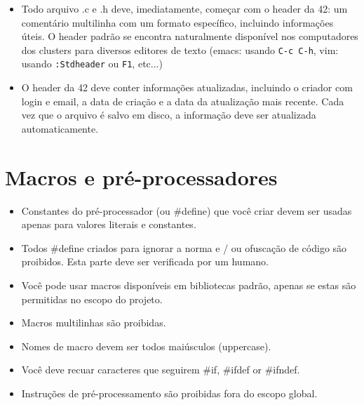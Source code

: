 \documentclass{42-pt}
\begin{document}
        \begin{itemize}

        \item Todo arquivo .c e .h deve, imediatamente, começar com o header da 42:
          um comentário multilinha com um formato específico, incluindo informações
          úteis. O header padrão se encontra naturalmente disponível nos computadores
          dos clusters para diversos editores de texto (emacs: usando \texttt{C-c C-h},
          vim: usando \texttt{:Stdheader} ou \texttt{F1}, etc...)

        \item O header da 42 deve conter informações atualizadas, incluindo o
          criador com login e email, a data de criação e a data da atualização
          mais recente. Cada vez que o arquivo é salvo em disco, a informação deve ser atualizada automaticamente.

        \end{itemize}
        \newpage
        
                
    \section{Macros e pré-processadores}

        \begin{itemize}

            \item Constantes do pré-processador (ou \#define) que você criar devem ser usadas
                apenas para valores literais e constantes.
            \item Todos \#define criados para ignorar a norma e / ou ofuscação de
                código são proibidos. Esta parte deve ser verificada por um humano.
            \item Você pode usar macros disponíveis em bibliotecas padrão, apenas
                se estas são permitidas no escopo do projeto.
            \item Macros multilinhas são proibidas.
            \item Nomes de macro devem ser todos maiúsculos (uppercase).
            \item Você deve recuar caracteres que seguirem \#if, \#ifdef
                or \#ifndef.
            \item Instruções de pré-processamento são proibidas fora do escopo global.
        \end{itemize}
        \newpage
\end{document}
